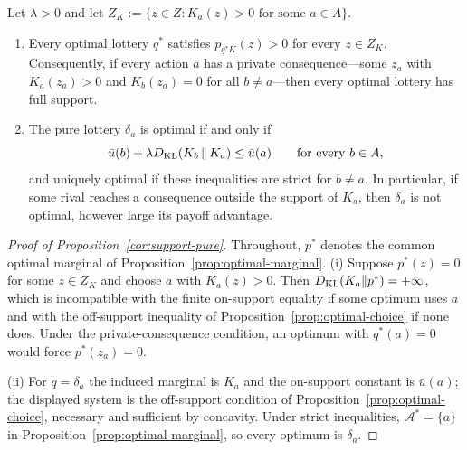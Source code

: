 \begin{proposition}\label{cor:support-pure}
Let $\lambda>0$ and let $Z_K:=\{z\in Z:K_a(z)>0\text{ for some }a\in A\}$.
\begin{enumerate}[label=\textup{(\roman*)},leftmargin=*]
\item Every optimal lottery $q^*$ satisfies $p_{q^*K}(z)>0$ for every $z\in Z_K$.  Consequently, if every action
$a$ has a private consequence---some $z_a$ with $K_a(z_a)>0$ and $K_b(z_a)=0$ for all $b\ne a$---then every
optimal lottery has full support.
\item The pure lottery $\delta_a$ is optimal if and only if
\[
 \bar u(b)+\lambda D_{\mathrm{KL}}\!\left(K_b\,\middle\|\,K_a\right)
 \le \bar u(a)
 \qquad\text{for every }b\in A,
\]
and uniquely optimal if these inequalities are strict for $b\ne a$.  In particular, if some rival reaches a
consequence outside the support of $K_a$, then $\delta_a$ is not optimal, however large its payoff advantage.
\end{enumerate}
\end{proposition}

\begin{proof}[Proof of Proposition~\ref{cor:support-pure}]
Throughout, $p^*$ denotes the common optimal marginal of Proposition~\ref{prop:optimal-marginal}.
(i) Suppose $p^*(z)=0$ for some $z\in Z_K$ and choose $a$ with $K_a(z)>0$.  Then
$D_{\mathrm{KL}}(K_a\|p^*)=+\infty$, which is incompatible with the finite on-support equality if some optimum uses $a$ and
with the off-support inequality of Proposition~\ref{prop:optimal-choice} if none does.  Under the
private-consequence condition, an optimum with $q^*(a)=0$ would force $p^*(z_a)=0$.

(ii) For $q=\delta_a$ the induced marginal is $K_a$ and the on-support constant is $\bar u(a)$; the displayed
system is the off-support condition of Proposition~\ref{prop:optimal-choice}, necessary and sufficient by
concavity.  Under strict inequalities, $\mathcal A^*=\{a\}$ in Proposition~\ref{prop:optimal-marginal}, so every
optimum is $\delta_a$.
\end{proof}

